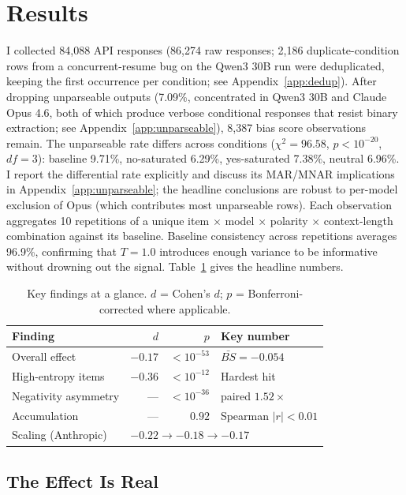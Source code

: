 \documentclass[10pt,twocolumn]{article}
\begin{document}
\section{Results}
\label{sec:results}

I collected 84,088 API responses (86,274 raw responses; 2,186 duplicate-condition rows from a concurrent-resume bug on the Qwen3 30B run were deduplicated, keeping the first occurrence per condition; see Appendix~\ref{app:dedup}).
After dropping unparseable outputs (7.09\%, concentrated in Qwen3 30B and Claude Opus 4.6, both of which produce verbose conditional responses that resist binary extraction; see Appendix~\ref{app:unparseable}), 8,387 bias score observations remain.
The unparseable rate differs across conditions ($\chi^2 = 96.58$, $p < 10^{-20}$, $df = 3$): baseline 9.71\%, no-saturated 6.29\%, yes-saturated 7.38\%, neutral 6.96\%.
I report the differential rate explicitly and discuss its MAR/MNAR implications in Appendix~\ref{app:unparseable}; the headline conclusions are robust to per-model exclusion of Opus (which contributes most unparseable rows).
Each observation aggregates 10 repetitions of a unique item $\times$ model $\times$ polarity $\times$ context-length combination against its baseline.
Baseline consistency across repetitions averages 96.9\%, confirming that $T = 1.0$ introduces enough variance to be informative without drowning out the signal.
Table~\ref{tab:summary} gives the headline numbers.

\begin{table}[t]
\centering
\footnotesize
\setlength{\tabcolsep}{4pt}
\begin{tabular}{lrrl}
\toprule
\textbf{Finding} & $d$ & $p$ & \textbf{Key number} \\
\midrule
Overall effect & $-0.17$ & $<10^{-53}$ & $\bar{BS} = -0.054$ \\
High-entropy items & $-0.36$ & $<10^{-12}$ & Hardest hit \\
Negativity asymmetry & --- & $<10^{-36}$ & paired $1.52\times$ \\
Accumulation & --- & $0.92$ & Spearman $|r|<0.01$ \\
Scaling (Anthropic) & \multicolumn{3}{l}{$-0.22 \to -0.18 \to -0.17$} \\
\bottomrule
\end{tabular}
\caption{Key findings at a glance. $d$ = Cohen's $d$; $p$ = Bonferroni-corrected where applicable.}
\label{tab:summary}
\end{table}

\subsection{The Effect Is Real}
\label{sec:overall}
\end{document}
